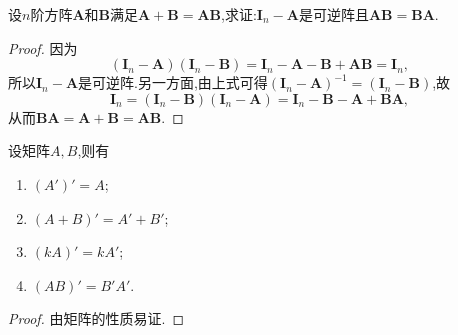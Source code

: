 \documentclass[../../main.tex]{subfiles}%
\begin{document}
\begin{proposition}
设\(n\)阶方阵\(\boldsymbol{A}\)和\(\boldsymbol{B}\)满足\(\boldsymbol{A}+\boldsymbol{B}=\boldsymbol{A}\boldsymbol{B}\),求证:\(\boldsymbol{I}_{n}-\boldsymbol{A}\)是可逆阵且\(\boldsymbol{A}\boldsymbol{B}=\boldsymbol{B}\boldsymbol{A}\).
\end{proposition}
\begin{proof}
因为
\[
(\boldsymbol{I}_{n}-\boldsymbol{A})(\boldsymbol{I}_{n}-\boldsymbol{B})=\boldsymbol{I}_{n}-\boldsymbol{A}-\boldsymbol{B}+\boldsymbol{A}\boldsymbol{B}=\boldsymbol{I}_{n},
\]
所以\(\boldsymbol{I}_{n}-\boldsymbol{A}\)是可逆阵.另一方面,由上式可得\((\boldsymbol{I}_{n}-\boldsymbol{A})^{-1}=(\boldsymbol{I}_{n}-\boldsymbol{B})\),故
\[
\boldsymbol{I}_{n}=(\boldsymbol{I}_{n}-\boldsymbol{B})(\boldsymbol{I}_{n}-\boldsymbol{A})=\boldsymbol{I}_{n}-\boldsymbol{B}-\boldsymbol{A}+\boldsymbol{B}\boldsymbol{A},
\]
从而\(\boldsymbol{B}\boldsymbol{A}=\boldsymbol{A}+\boldsymbol{B}=\boldsymbol{A}\boldsymbol{B}\).
\end{proof}

\begin{proposition}[矩阵转置的性质]\label{proposition:矩阵转置的性质}
设矩阵$A,B$,则有
\begin{enumerate}
\item $(A')'=A$;
\item $(A+B)'=A'+B'$;
\item $(kA)'=kA'$;
\item $(AB)'=B'A'$.
\end{enumerate}
\end{proposition}
\begin{proof}
由矩阵的性质易证.
\end{proof}
\end{document}
